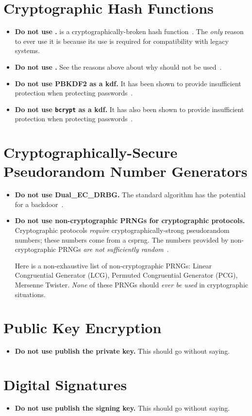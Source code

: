 \section{Cryptographic Hash Functions}

\begin{itemize}
\item \textbf{Do not use \MDFive{}.}
    \MDFive{} is a cryptographically-broken \gls{hash function}~\cite{rfc6151}.
    The \emph{only} reason to ever use it is because its use is required
        for compatibility with legacy systems.
\item \textbf{Do not use \ShaOne{}.}
    See the reasons above about why \MDFive{} should not be used~\cite{rfc6194}.
\item \textbf{Do not use PBKDF2 as a \gls{kdf}.}
    It has been shown to provide insufficient protection
    when protecting passwords~\cite{blocki2018economics}.
\item \textbf{Do not use \texttt{bcrypt} as a \gls{kdf}.}
    It has also been shown to provide insufficient protection
    when protecting passwords~\cite{blocki2018economics}.
\end{itemize}

\section{Cryptographically-Secure Pseudorandom Number Generators}

\begin{itemize}
\item \textbf{Do not use Dual\_EC\_DRBG.}
    The standard algorithm has the potential for a
    backdoor~\cite{BernsteinDualEC}.
\item \textbf{Do not use non-cryptographic PRNGs for cryptographic protocols.}
    Cryptographic protocols \emph{require} cryptographically-strong
    pseudorandom numbers;
    these numbers come from a \gls{csprng}.
    The numbers provided by non-cryptographic PRNGs
    \emph{are not sufficiently random}~\cite{marsaglia1968random,bouillaguet2020practical}.

    Here is a non-exhaustive list of non-cryptographic PRNGs:
    Linear Congruential Generator (LCG), Permuted Congruential Generator (PCG),
    Mersenne Twister.
    \emph{None} of these PRNGs should \emph{ever be used}
    in cryptographic situations.
\end{itemize}

\section{Public Key Encryption}

\begin{itemize}
\item \textbf{Do not use publish the private key.}
    This should go without saying.
\end{itemize}

\section{Digital Signatures}

\begin{itemize}
\item \textbf{Do not use publish the signing key.}
    This should go without saying.
\end{itemize}

